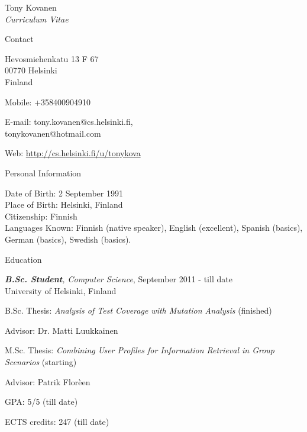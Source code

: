 \documentclass[10pt]{article}
\newenvironment{sublist}{%
	\begin{list}{}{%
		\setlength{\itemsep}{0em}\setlength{\parsep}{0em}%
		\setlength{\topsep}{0em}\setlength{\parskip}{0em}%
	}%
}%
{ \end{list} }
\begin{document}
\begin{cv}{Tony Kovanen\\{\large \itshape Curriculum Vitae}}

\begin{cvlist}{Contact}
	\item
	Hevosmiehenkatu 13 F 67\\
	00770 Helsinki\\
	Finland
	\item Mobile: +358400904910
	\item E-mail: tony.kovanen@cs.helsinki.fi,\\
	\hspace{10mm}tonykovanen@hotmail.com
	\item  Web: \url{http://cs.helsinki.fi/u/tonykova}
\end{cvlist}


\begin{cvlist}{Personal Information}
	\item Date of Birth: 2 September 1991\\
		Place of Birth: Helsinki, Finland\\
		Citizenship: Finnish\\
        Languages Known: Finnish (native speaker), English (excellent), Spanish (basics), German (basics), Swedish (basics).
\end{cvlist}

\begin{cvlist}{Education}
	\item \emph{{\bf B.Sc. Student}, Computer Science}, September 2011 - till date\\
	University of Helsinki, Finland
	\begin{sublist}
    \item B.Sc. Thesis: \textit{Analysis of Test Coverage with Mutation Analysis} (finished)
		\item Advisor: Dr. Matti Luukkainen
        \item M.Sc. Thesis: \textit{Combining User Profiles for Information Retrieval in Group Scenarios} (starting)
        \item Advisor: Patrik Flor\`{e}en
        \item GPA: 5/5 (till date)
        \item ECTS credits: 247 (till date)
	\end{sublist}
\end{cvlist}


\end{cv}
\end{document}
